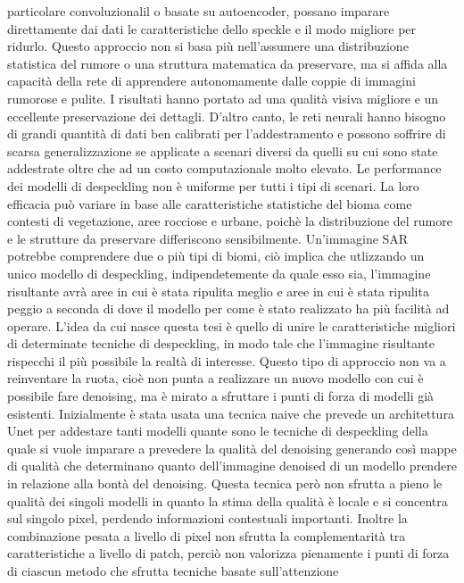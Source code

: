 particolare convoluzionalil o basate su autoencoder, possano imparare direttamente dai dati le caratteristiche
dello speckle e il modo migliore per ridurlo. Questo approccio non si basa più nell'assumere una distribuzione 
statistica del rumore o una struttura matematica da preservare, ma si affida alla capacità della rete di 
apprendere autonomamente dalle coppie di immagini rumorose e pulite. I risultati hanno portato ad una qualità 
visiva migliore e un eccellente preservazione dei dettagli. D'altro canto, le reti neurali hanno bisogno 
di grandi quantità di dati ben calibrati per l'addestramento e possono soffrire di scarsa generalizzazione se 
applicate a scenari diversi da quelli su cui sono state addestrate oltre che ad un costo computazionale molto elevato. 
Le performance dei modelli di despeckling non è uniforme per tutti i tipi di scenari. La loro efficacia può variare
in base alle caratteristiche statistiche del bioma come contesti di vegetazione, aree rocciose e urbane, 
poichè la distribuzione del rumore e le strutture da preservare differiscono sensibilmente. Un'immagine SAR potrebbe 
comprendere due o più tipi di biomi, ciò implica che utlizzando un unico modello di despeckling, 
indipendetemente da quale esso sia, l'immagine risultante avrà aree in cui è stata ripulita meglio e aree in cui è 
stata ripulita peggio a seconda di dove il modello per come è stato realizzato ha più facilità ad operare.
L'idea da cui nasce questa tesi è quello di unire le caratteristiche migliori di determinate tecniche di despeckling, 
in modo tale che l'immagine risultante rispecchi il più possibile la realtà di interesse. Questo tipo di approccio non va a 
reinventare la ruota, cioè non punta a realizzare un nuovo modello con cui è possibile fare denoising, ma è mirato
a sfruttare i punti di forza di modelli già esistenti. Inizialmente è stata usata una tecnica naive che 
prevede un architettura Unet per addestare tanti modelli quante sono le tecniche di despeckling 
della quale si vuole imparare a prevedere la qualità del denoising generando così mappe di qualità 
che determinano quanto dell'immagine denoised di un  modello prendere in relazione alla bontà del denoising.
Questa tecnica però non sfrutta a pieno le qualità dei singoli modelli in quanto la stima della qualità è locale 
e si concentra sul singolo pixel, perdendo informazioni contestuali importanti. 
Inoltre la combinazione pesata a livello di pixel non sfrutta la complementarità tra caratteristiche a livello di 
patch, perciò non valorizza pienamente i punti di forza di ciascun metodo \cite{li2024crossfuse} che sfrutta tecniche basate sull'attenzione 
